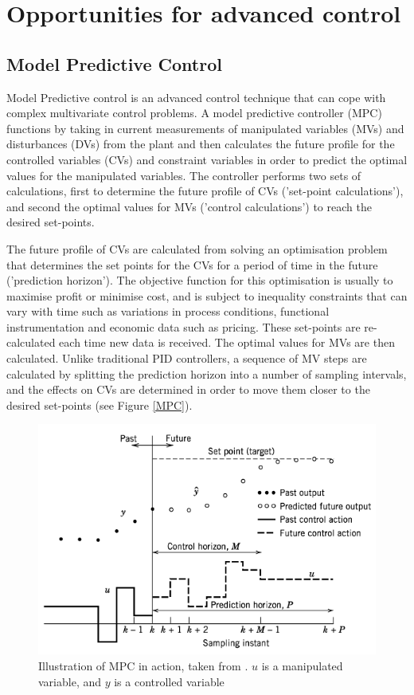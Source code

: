 \section{Opportunities for advanced control}

\subsection{Model Predictive Control}
Model Predictive control is an advanced control technique that can cope with complex multivariate control problems. A model predictive controller (MPC) functions by taking in current measurements of manipulated variables (MVs) and disturbances (DVs) from the plant and then calculates the future profile for the controlled variables (CVs) and constraint variables in order to predict the optimal values for the manipulated variables. The controller performs two sets of calculations, first to determine the future profile of CVs ('set-point calculations'), and second the optimal values for MVs ('control calculations') to reach the desired set-points. 

The future profile of CVs are calculated from solving an optimisation problem that determines the set points for the CVs for a period of time in the future ('prediction horizon'). The objective function for this optimisation is usually to maximise profit or minimise cost, and is subject to inequality constraints that can vary with time such as variations in process conditions, functional instrumentation and economic data such as pricing. These set-points are re-calculated each time new data is received. The optimal values for MVs are then calculated. Unlike traditional PID controllers, a sequence of MV steps are calculated by splitting the prediction horizon into a number of sampling intervals, and the effects on CVs are determined in order to move them closer to the desired set-points (see Figure \ref{MPC}). 

    \begin{figure}
        \centering
        \includegraphics[width=\linewidth]{chapters/4-operation-control/4-Figures/MPC-Seborg-2011.png}
        \caption{Illustration of MPC in action, taken from \textcite{}. $u$ is a manipulated variable, and $y$ is a controlled variable}
        \label{fig:MPC}
    \end{figure}

